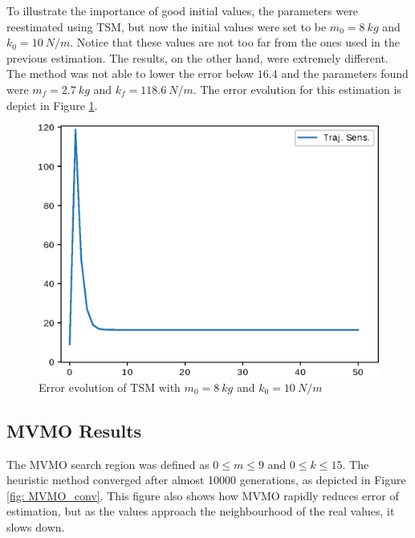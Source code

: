 To illustrate the importance of good initial values, the parameters were reestimated using TSM, but now the initial values were set to be $m_{0} = 8\ kg$ and $k_{0} = 10\ N/m$. Notice that these values are not too far from the ones used in the previous estimation. The results, on the other hand, were extremely different. The method was not able to lower the error below $16.4$ and the parameters found were $m_{f} = 2.7\ kg$ and $k_{f} = 118.6\ N/m$. The error evolution for this estimation is depict in Figure \ref{fig: TS_nconv}.

\begin{figure}[h]
	\caption{Error evolution of TSM with $m_{0} = 8\ kg$ and $k_{0} = 10\ N/m$}
	\begin{center}
		\includegraphics[scale=0.7]{Images/TS_nconv.eps}
	\end{center}
	\label{fig: TS_nconv}
\end{figure}

\subsection{MVMO Results}

The MVMO search region was defined as $0 \leq m \leq 9$ and $0 \leq k \leq 15$. The heuristic method converged after almost 10000 generations, as depicted in Figure \ref{fig: MVMO_conv}. This figure also shows how MVMO rapidly reduces error of estimation, but as the values approach the neighbourhood of the real values, it slows down.

